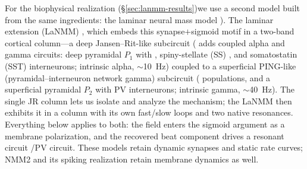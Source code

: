 \documentclass[11pt,a4paper]{article}
\providecommand{\DIFaddtex}[1]{{\protect\color{blue} \sf #1}} %
\providecommand{\DIFdeltex}[1]{{\protect\color{red} \scriptsize #1}} %
\providecommand{\DIFaddbegin}{} %
\providecommand{\DIFaddend}{} %
\providecommand{\DIFdelbegin}{} %
\providecommand{\DIFdelend}{} %
\providecommand{\DIFadd}[1]{\texorpdfstring{\DIFaddtex{#1}}{#1}} %
\providecommand{\DIFdel}[1]{\texorpdfstring{\DIFdeltex{#1}}{}} %
\begin{document}
\DIFdel{For the biophysical realization (\S\ref{sec:lanmm-results})we use a second model
built from the same ingredients: the laminar neural mass model }\DIFdelend \DIFaddbegin \DIFadd{). The laminar extension }\DIFaddend (LaNMM)
\cite{ruffini2025cfc,sanchezTodo2023} \DIFdelbegin \DIFdel{, which embeds this synapse$+$sigmoid motif in
a two-band cortical column---a deep
Jansen--Rit-like subcircuit (}\DIFdelend \DIFaddbegin \DIFadd{adds coupled alpha and gamma circuits: deep
}\DIFaddend pyramidal $P_1$\DIFdelbegin \DIFdel{with }\DIFdelend \DIFaddbegin \DIFadd{, }\DIFaddend spiny-stellate (SS)\DIFaddbegin \DIFadd{, }\DIFaddend and somatostatin (SST) \DIFdelbegin \DIFdel{interneurons; intrinsic alpha, $\sim$10~Hz) coupled to a
superficial PING-like (pyramidal--interneuron network
gamma) subcircuit (}\DIFdelend \DIFaddbegin \DIFadd{populations, and a
superficial }\DIFaddend pyramidal $P_2$\DIFdelbegin \DIFdel{with PV interneurons; intrinsic gamma,
$\sim$40~Hz). The single JR column lets us isolate and
analyze the
mechanism; the LaNMM then exhibits it in a column with its own fast/slow loops and two native resonances. Everything below applies to both: the field enters the sigmoid argument as a
membrane polarization, and the recovered beat component drives a resonant circuit}\DIFdelend \DIFaddbegin \DIFadd{/PV circuit. These models retain dynamic synapses and
static rate curves; NMM2 and its spiking realization retain membrane dynamics as well}\DIFaddend .
\end{document}
